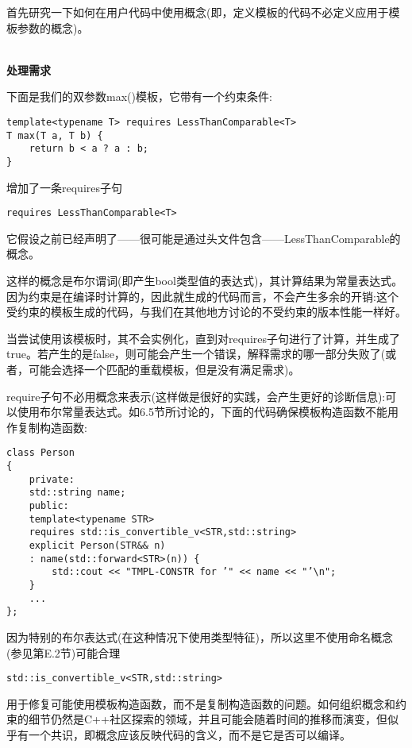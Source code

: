 
首先研究一下如何在用户代码中使用概念(即，定义模板的代码不必定义应用于模板参数的概念)。

\hspace*{\fill} \\ %
\noindent
\textbf{处理需求}

下面是我们的双参数max()模板，它带有一个约束条件:

\begin{lstlisting}[style=styleCXX]
template<typename T> requires LessThanComparable<T>
T max(T a, T b) {
	return b < a ? a : b;
}
\end{lstlisting}

增加了一条requires子句

\begin{lstlisting}[style=styleCXX]
requires LessThanComparable<T>
\end{lstlisting}

它假设之前已经声明了——很可能是通过头文件包含——LessThanComparable的概念。

这样的概念是布尔谓词(即产生bool类型值的表达式)，其计算结果为常量表达式。因为约束是在编译时计算的，因此就生成的代码而言，不会产生多余的开销:这个受约束的模板生成的代码，与我们在其他地方讨论的不受约束的版本性能一样好。

当尝试使用该模板时，其不会实例化，直到对requires子句进行了计算，并生成了true。若产生的是false，则可能会产生一个错误，解释需求的哪一部分失败了(或者，可能会选择一个匹配的重载模板，但是没有满足需求)。

require子句不必用概念来表示(这样做是很好的实践，会产生更好的诊断信息):可以使用布尔常量表达式。如6.5节所讨论的，下面的代码确保模板构造函数不能用作复制构造函数:

\begin{lstlisting}[style=styleCXX]
class Person
{
	private:
	std::string name;
	public:
	template<typename STR>
	requires std::is_convertible_v<STR,std::string>
	explicit Person(STR&& n)
	: name(std::forward<STR>(n)) {
		std::cout << "TMPL-CONSTR for ’" << name << "’\n";
	}
	...
};
\end{lstlisting}

因为特别的布尔表达式(在这种情况下使用类型特征)，所以这里不使用命名概念(参见第E.2节)可能合理

\begin{lstlisting}[style=styleCXX]
std::is_convertible_v<STR,std::string>
\end{lstlisting}

用于修复可能使用模板构造函数，而不是复制构造函数的问题。如何组织概念和约束的细节仍然是C++社区探索的领域，并且可能会随着时间的推移而演变，但似乎有一个共识，即概念应该反映代码的含义，而不是它是否可以编译。


